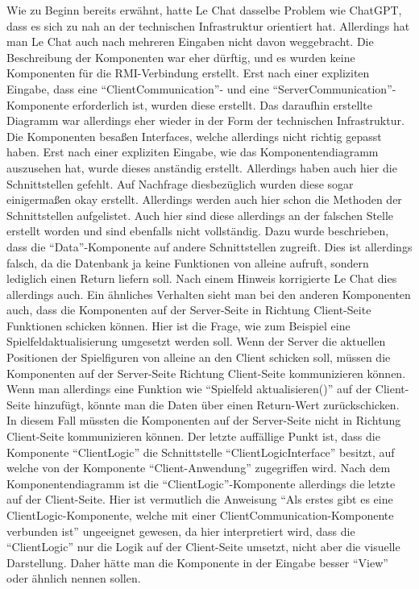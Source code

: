 Wie zu Beginn bereits erwähnt, hatte Le Chat dasselbe Problem wie ChatGPT, dass es sich zu nah an der technischen Infrastruktur orientiert 
hat. Allerdings hat man Le Chat auch nach mehreren Eingaben nicht davon weggebracht. Die Beschreibung der Komponenten war eher dürftig, und 
es wurden keine Komponenten für die RMI-Verbindung erstellt. Erst nach einer expliziten Eingabe, dass eine ``ClientCommunication''- und eine 
``ServerCommunication''-Komponente erforderlich ist, wurden diese erstellt. Das daraufhin erstellte Diagramm war allerdings eher wieder in der 
Form der technischen Infrastruktur. Die Komponenten besaßen Interfaces, welche allerdings nicht richtig gepasst haben. Erst nach einer 
expliziten Eingabe, wie das Komponentendiagramm auszusehen hat, wurde dieses anständig erstellt. Allerdings haben auch hier die 
Schnittstellen gefehlt. Auf Nachfrage diesbezüglich wurden diese sogar einigermaßen okay erstellt. Allerdings werden auch hier schon die 
Methoden der Schnittstellen aufgelistet. Auch hier sind diese allerdings an der falschen Stelle erstellt worden und sind ebenfalls nicht 
vollständig. Dazu wurde beschrieben, dass die ``Data''-Komponente auf andere Schnittstellen zugreift. Dies ist allerdings falsch, da die 
Datenbank ja keine Funktionen von alleine aufruft, sondern lediglich einen Return liefern soll. Nach einem Hinweis korrigierte Le Chat dies 
allerdings auch. Ein ähnliches Verhalten sieht man bei den anderen Komponenten auch, dass die Komponenten auf der Server-Seite in Richtung 
Client-Seite Funktionen schicken können. Hier ist die Frage, wie zum Beispiel eine Spielfeldaktualisierung umgesetzt werden soll. Wenn der 
Server die aktuellen Positionen der Spielfiguren von alleine an den Client schicken soll, müssen die Komponenten auf der Server-Seite Richtung 
Client-Seite kommunizieren können. Wenn man allerdings eine Funktion wie ``Spielfeld aktualisieren()'' auf der Client-Seite hinzufügt, könnte 
man die Daten über einen Return-Wert zurückschicken. In diesem Fall müssten die Komponenten auf der Server-Seite nicht in Richtung Client-Seite 
kommunizieren können. Der letzte auffällige Punkt ist, dass die Komponente ``ClientLogic'' die Schnittstelle ``ClientLogicInterface'' besitzt, 
auf welche von der Komponente ``Client-Anwendung'' zugegriffen wird. Nach dem Komponentendiagramm ist die ``ClientLogic''-Komponente allerdings die 
letzte auf der Client-Seite. Hier ist vermutlich die Anweisung ``Als erstes gibt es eine ClientLogic-Komponente, welche mit einer 
ClientCommunication-Komponente verbunden ist'' ungeeignet gewesen, da hier interpretiert wird, dass die ``ClientLogic'' nur die Logik auf der 
Client-Seite umsetzt, nicht aber die visuelle Darstellung. Daher hätte man die Komponente in der Eingabe besser ``View'' oder ähnlich nennen 
sollen.

